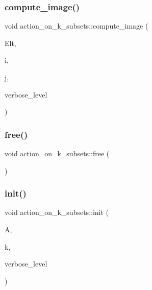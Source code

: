 \subsubsection{\texorpdfstring{compute\+\_\+image()}{compute\_image()}}
{\footnotesize\ttfamily void action\+\_\+on\+\_\+k\+\_\+subsets\+::compute\+\_\+image (\begin{DoxyParamCaption}\item[{\mbox{\hyperlink{galois_8h_a09fddde158a3a20bd2dcadb609de11dc}{I\+NT}} $\ast$}]{Elt,  }\item[{\mbox{\hyperlink{galois_8h_a09fddde158a3a20bd2dcadb609de11dc}{I\+NT}}}]{i,  }\item[{\mbox{\hyperlink{galois_8h_a09fddde158a3a20bd2dcadb609de11dc}{I\+NT}} \&}]{j,  }\item[{\mbox{\hyperlink{galois_8h_a09fddde158a3a20bd2dcadb609de11dc}{I\+NT}}}]{verbose\+\_\+level }\end{DoxyParamCaption})}

\mbox{\label{classaction__on__k__subsets_a2acb6066d1df683d30d8e640e0613e6f}} 
\subsubsection{\texorpdfstring{free()}{free()}}
{\footnotesize\ttfamily void action\+\_\+on\+\_\+k\+\_\+subsets\+::free (\begin{DoxyParamCaption}{ }\end{DoxyParamCaption})}

\mbox{\label{classaction__on__k__subsets_a76ad74d653ba2b0d6ac8715b77060874}} 
\subsubsection{\texorpdfstring{init()}{init()}}
{\footnotesize\ttfamily void action\+\_\+on\+\_\+k\+\_\+subsets\+::init (\begin{DoxyParamCaption}\item[{\mbox{\hyperlink{classaction}{action}} $\ast$}]{A,  }\item[{\mbox{\hyperlink{galois_8h_a09fddde158a3a20bd2dcadb609de11dc}{I\+NT}}}]{k,  }\item[{\mbox{\hyperlink{galois_8h_a09fddde158a3a20bd2dcadb609de11dc}{I\+NT}}}]{verbose\+\_\+level }\end{DoxyParamCaption})}

